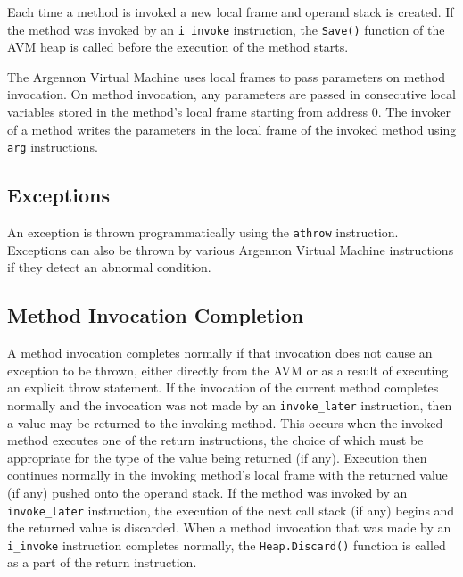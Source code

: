 
Each time a method is invoked a new local frame
and operand stack is created. If the method was invoked by an \texttt{i\_invoke} instruction,
the \texttt{Save()} function of the AVM heap is called before the execution of the method starts.

The Argennon Virtual Machine uses local frames to pass parameters on
method invocation. On method invocation, any parameters are passed in consecutive local variables stored in the
method's local frame starting from address 0. The invoker of a method writes the parameters in the local frame
of the invoked method using \texttt{arg} instructions.


\subsection{Exceptions}\label{subsec:exceptions}

An exception is thrown programmatically using the \texttt{athrow} instruction. Exceptions can also be thrown by
various Argennon Virtual Machine instructions if they detect an abnormal condition.


\subsection{Method Invocation Completion}\label{subsec:method-invocation-completion}

A method invocation completes normally if that invocation does not cause an exception to be thrown, either
directly from the AVM or as a result of executing an explicit throw statement. If the invocation of the current
method completes normally and the invocation was not made by an \texttt{invoke\_later} instruction, then a value may be
returned to the invoking method. This occurs when the invoked method executes one of the return instructions, the
choice of which must be appropriate for the type of the value being returned (if any). Execution then continues
normally in the invoking method's local frame with the returned
value (if any) pushed onto the operand stack. If the method was invoked by an \texttt{invoke\_later} instruction,
the execution of the next call stack (if any) begins and the returned value
is discarded. When a method invocation that was made by
an \texttt{i\_invoke} instruction completes normally,
the \texttt{Heap.Discard()} function is called as a part of the return instruction.

